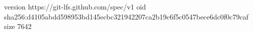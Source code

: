 version https://git-lfs.github.com/spec/v1
oid sha256:d4105abdd598953bd145ecbc321942207ca2b19c6f5c0547bece6dc0f0c79caf
size 7642
